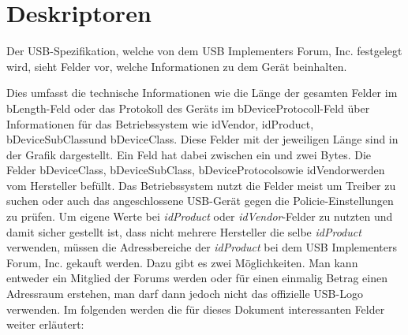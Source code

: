 \newpage
\section{Deskriptoren}\label{Deskriptoren}
Der USB-Spezifikation, welche von dem USB Implementers Forum, Inc.\cite{USBAbout} festgelegt wird, sieht Felder vor, welche Informationen zu dem Gerät beinhalten.


Dies umfasst die technische Informationen wie die Länge der gesamten Felder im \glqq bLength\grqq-Feld oder das Protokoll des Geräts im \glqq bDeviceProtocoll\grqq-Feld über Informationen für das Betriebssystem wie \glqq idVendor\grqq, \glqq idProduct\grqq, \glqq bDeviceSubClass\grqq und \glqq bDeviceClass\grqq. Diese Felder mit der jeweiligen Länge sind in der Grafik dargestellt. Ein Feld hat dabei zwischen ein und zwei Bytes. Die Felder \glqq bDeviceClass\grqq, \glqq bDeviceSubClass\grqq, \glqq bDeviceProtocol\grqq sowie \glqq idVendor\grqq werden vom Hersteller befüllt.\cite{USBDesk} Das Betriebssystem nutzt die Felder meist um Treiber zu suchen oder auch das angeschlossene USB-Gerät gegen die Policie-Einstellungen zu prüfen. Um eigene Werte bei \textit{idProduct} oder \textit{idVendor}-Felder zu nutzten und damit sicher gestellt ist, dass nicht mehrere Hersteller die selbe \textit{idProduct} verwenden, müssen die Adressbereiche der \textit{idProduct} bei dem USB Implementers Forum, Inc. gekauft werden. Dazu gibt es zwei Möglichkeiten. Man kann entweder ein Mitglied der Forums werden oder für einen einmalig Betrag einen Adressraum erstehen, man darf dann jedoch nicht das offizielle USB-Logo verwenden. \cite{USBVendor} Im folgenden werden die für dieses Dokument interessanten Felder weiter erläutert:

